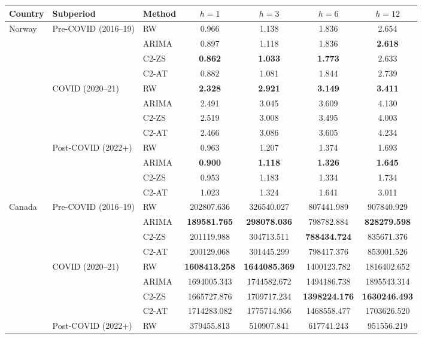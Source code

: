 \small
\begin{tabular}{lllcccc}
\toprule
Country & Subperiod & Method & $h{=}1$ & $h{=}3$ & $h{=}6$ & $h{=}12$ \\
\midrule
\multirow{12}{*}{Norway} & \multirow{4}{*}{Pre-COVID (2016--19)} & RW & 0.966 & 1.138 & 1.836 & 2.654 \\
 &  & ARIMA & 0.897 & 1.118 & 1.836 & \textbf{2.618} \\
 &  & C2-ZS & \textbf{0.862} & \textbf{1.033} & \textbf{1.773} & 2.633 \\
 &  & C2-AT & 0.882 & 1.081 & 1.844 & 2.739 \\
 & \multirow{4}{*}{COVID (2020--21)} & RW & \textbf{2.328} & \textbf{2.921} & \textbf{3.149} & \textbf{3.411} \\
 &  & ARIMA & 2.491 & 3.045 & 3.609 & 4.130 \\
 &  & C2-ZS & 2.519 & 3.008 & 3.495 & 4.003 \\
 &  & C2-AT & 2.466 & 3.086 & 3.605 & 4.234 \\
 & \multirow{4}{*}{Post-COVID (2022+)} & RW & 0.963 & 1.207 & 1.374 & 1.693 \\
 &  & ARIMA & \textbf{0.900} & \textbf{1.118} & \textbf{1.326} & \textbf{1.645} \\
 &  & C2-ZS & 0.953 & 1.183 & 1.334 & 1.734 \\
 &  & C2-AT & 1.023 & 1.324 & 1.641 & 3.011 \\
\midrule
\multirow{12}{*}{Canada} & \multirow{4}{*}{Pre-COVID (2016--19)} & RW & 202807.636 & 326540.027 & 807441.989 & 907840.929 \\
 &  & ARIMA & \textbf{189581.765} & \textbf{298078.036} & 798782.884 & \textbf{828279.598} \\
 &  & C2-ZS & 201119.988 & 304713.511 & \textbf{788434.724} & 835671.376 \\
 &  & C2-AT & 200129.068 & 301445.299 & 798417.376 & 853001.526 \\
 & \multirow{4}{*}{COVID (2020--21)} & RW & \textbf{1608413.258} & \textbf{1644085.369} & 1400123.782 & 1816402.652 \\
 &  & ARIMA & 1694005.343 & 1744582.672 & 1494186.738 & 1895543.314 \\
 &  & C2-ZS & 1665727.876 & 1709717.234 & \textbf{1398224.176} & \textbf{1630246.493} \\
 &  & C2-AT & 1714283.082 & 1775714.956 & 1468558.477 & 1703626.520 \\
 & \multirow{4}{*}{Post-COVID (2022+)} & RW & 379455.813 & 510907.841 & 617741.243 & 951556.219 \\

\end{tabular}
